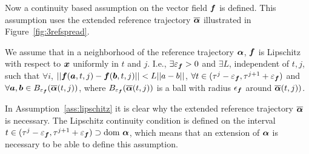 \documentclass[../DC2017114Bouma.tex]{subfiles}
\begin{document}
Now a continuity based assumption on the vector field ${\boldsymbol{f}}$ is defined. This assumption uses the extended reference trajectory $\overline{\boldsymbol{\alpha}}$ illustrated in Figure~\ref{fig:3refspread}.

\begin{myass}\label{ass:lipschitz}
We assume that in a neighborhood of the reference trajectory $\boldsymbol{\alpha}$, ${\boldsymbol{f}}$ is Lipschitz with respect to ${\boldsymbol{x}}$ uniformly in $t$ and $j$. I.e., $\exists\varepsilon_{{\boldsymbol{f}}}>0$ and $\exists L$, independent of $t,j$, such that $\forall i$, $||{\boldsymbol{f}}({\boldsymbol{a}},t,j) - {\boldsymbol{f}}({\boldsymbol{b}},t,j)||<L||a-b||$, $\forall t\in (\tau^j - \varepsilon_{{\boldsymbol{f}}},\tau^{j+1} + \varepsilon_{{\boldsymbol{f}}})$ and $\forall {\boldsymbol{a}},{\boldsymbol{b}}\in B_{\varepsilon_{{\boldsymbol{f}}}}(\overline{\boldsymbol{\alpha}}(t,j))$, where $B_{\varepsilon_{{\boldsymbol{f}}}}(\overline{\boldsymbol{\alpha}}(t,j))$ is a ball with radius $\epsilon_{{\boldsymbol{f}}}$ around $\overline{\boldsymbol{\alpha}}(t,j))$.
\end{myass}

In Assumption~\ref{ass:lipschitz} it is clear why the extended reference trajectory $\overline{\boldsymbol{\alpha}}$ is necessary. The Lipschitz continuity condition is defined on the interval $t \in (\tau^j - \varepsilon_{{\boldsymbol{f}}},\tau^{j+1} + \varepsilon_{{\boldsymbol{f}}}) \supset \text{dom }\boldsymbol{\alpha}$, which means that an extension of $\boldsymbol{\alpha}$ is necessary to be able to define this assumption.
\end{document}
